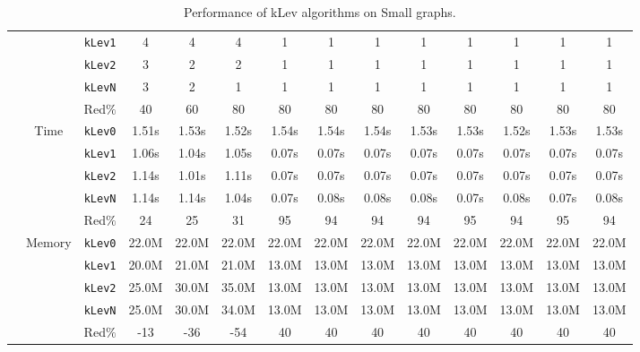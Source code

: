 \begin{table}[h!]
{\begin{tabular}{|l|c|c|c|c|c|c|c|c|c|c|c|c|c|}
& & \texttt{kLev1} & 4 & 4 & 4 & 1 & 1 & 1 & 1 & 1 & 1 & 1 & 1 \\
& & \texttt{kLev2} & 3 & 2 & 2 & 1 & 1 & 1 & 1 & 1 & 1 & 1 & 1 \\
& & \texttt{kLevN} & 3 & 2 & 1 & 1 & 1 & 1 & 1 & 1 & 1 & 1 & 1 \\
& & Red$\%$ & 40 & 60 & 80 & 80 & 80 & 80 & 80 & 80 & 80 & 80 & 80 \\
\cline{2-14} &
\multirow{5}{*}{Time}
& \texttt{kLev0} & 1.51s & 1.53s & 1.52s & 1.54s & 1.54s & 1.54s & 1.53s & 1.53s & 1.52s & 1.53s & 1.53s \\
& & \texttt{kLev1} & 1.06s & 1.04s & 1.05s & 0.07s & 0.07s & 0.07s & 0.07s & 0.07s & 0.07s & 0.07s & 0.07s \\
& & \texttt{kLev2} & 1.14s & 1.01s & 1.11s & 0.07s & 0.07s & 0.07s & 0.07s & 0.07s & 0.07s & 0.07s & 0.07s \\
& & \texttt{kLevN} & 1.14s & 1.14s & 1.04s & 0.07s & 0.08s & 0.08s & 0.08s & 0.07s & 0.08s & 0.07s & 0.08s \\
& & Red$\%$ & 24 & 25 & 31 & 95 & 94 & 94 & 94 & 95 & 94 & 95 & 94 \\
\cline{2-14} &
\multirow{5}{*}{Memory}
& \texttt{kLev0} & 22.0M & 22.0M & 22.0M & 22.0M & 22.0M & 22.0M & 22.0M & 22.0M & 22.0M & 22.0M & 22.0M \\
& & \texttt{kLev1} & 20.0M & 21.0M & 21.0M & 13.0M & 13.0M & 13.0M & 13.0M & 13.0M & 13.0M & 13.0M & 13.0M \\
& & \texttt{kLev2} & 25.0M & 30.0M & 35.0M & 13.0M & 13.0M & 13.0M & 13.0M & 13.0M & 13.0M & 13.0M & 13.0M \\
& & \texttt{kLevN} & 25.0M & 30.0M & 34.0M & 13.0M & 13.0M & 13.0M & 13.0M & 13.0M & 13.0M & 13.0M & 13.0M \\
& & Red$\%$ & -13 & -36 & -54 & 40 & 40 & 40 & 40 & 40 & 40 & 40 & 40 \\
\hline
\end{tabular}%
}
\caption{Performance of kLev algorithms on Small graphs.}
\label{tab:small_klev}
\end{table}
